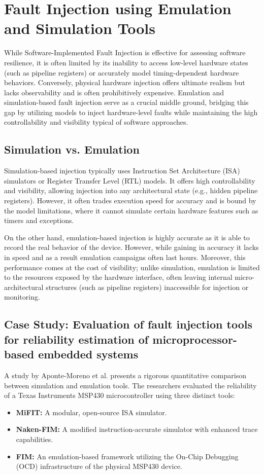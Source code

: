\section{Fault Injection using Emulation and Simulation Tools}

While Software-Implemented Fault Injection is effective for assessing software resilience, it is often limited by its inability to access low-level hardware states (such as pipeline registers) or accurately model timing-dependent hardware behaviors. Conversely, physical hardware injection offers ultimate realism but lacks observability and is often prohibitively expensive. Emulation and simulation-based fault injection serve as a crucial middle ground, bridging this gap by utilizing models to inject hardware-level faults while maintaining the high controllability and visibility typical of software approaches.

\subsection{Simulation vs. Emulation}
Simulation-based injection typically uses Instruction Set Architecture (ISA) simulators or Register Transfer Level (RTL) models. It offers high controllability and visibility, allowing injection into any architectural state (e.g., hidden pipeline registers). However, it often trades execution speed for accuracy and is bound by the model limitations, where it cannot simulate certain hardware features such as timers and exceptions.

On the other hand, emulation-based injection is highly accurate as it is able to record the real behavior of the device.
However, while gaining in accuracy it lacks in speed and as a result emulation campaigns often last hours. Moreover, this performance comes at the cost of visibility; unlike simulation, emulation is limited to the resources exposed by the hardware interface, often leaving internal micro-architectural structures (such as pipeline registers) inaccessible for injection or monitoring.

\subsection{Case Study: Evaluation of fault injection tools for reliability estimation of microprocessor-based embedded systems}
A study by Aponte-Moreno et al. \cite{EmulationSite} presents a rigorous quantitative comparison between simulation and emulation tools. The researchers evaluated the reliability of a Texas Instruments MSP430 microcontroller using three distinct tools:
\begin{itemize}
    \item \textbf{MiFIT:} A modular, open-source ISA simulator.
    \item \textbf{Naken-FIM:} A modified instruction-accurate simulator with enhanced trace capabilities.
    \item \textbf{FIM:} An emulation-based framework utilizing the On-Chip Debugging (OCD) infrastructure of the physical MSP430 device.
\end{itemize}

